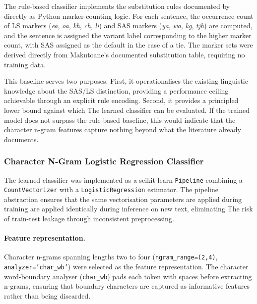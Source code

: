 \documentclass[12pt]{ThesisRU}
\begin{document}
The rule-based classifier implements the substitution rules documented by \citet{makutoane2022people} directly as Python
marker-counting logic. For each sentence, the occurrence count of LS
markers (\textit{ea}, \textit{oa}, \textit{kh}, \textit{ch},
\textit{li}) and SAS markers (\textit{ya}, \textit{wa},
\textit{kg}, \textit{tjh}) are computed, and the sentence is
assigned the variant label corresponding to the higher marker count,
with SAS assigned as the default in the case of a tie. The marker
sets were derived directly from Makutoane's documented substitution
table, requiring no training data.

This baseline serves two purposes. First, it operationalises the
existing linguistic knowledge about the SAS/LS distinction,
providing a performance ceiling achievable through an explicit rule
encoding. Second, it provides a principled lower bound against which
The learned classifier can be evaluated. If the trained model does
not surpass the rule-based baseline, this would indicate that the
character n-gram features capture nothing beyond what the literature
already documents.

\subsubsection{Character N-Gram Logistic Regression Classifier}
\label{sec:learned}

The learned classifier was implemented as a scikit-learn
\texttt{Pipeline} combining a \texttt{CountVectorizer} with a
\texttt{LogisticRegression} estimator. The pipeline abstraction
ensures that the same vectorisation parameters are applied during training
are applied identically during inference on new text, eliminating
The risk of train-test leakage through inconsistent preprocessing.

\paragraph{Feature representation.}
Character n-grams spanning lengths two to four
(\texttt{ngram\_range=(2,4)}, \texttt{analyzer='char\_wb'}) were
selected as the feature representation. The character word-boundary
analyser (\texttt{char\_wb}) pads each token with spaces before
extracting n-grams, ensuring that boundary characters are captured
as informative features rather than being discarded.
\end{document}
